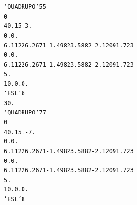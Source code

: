 \begin{center}
\begin{tiny}
\begin{alltt}
                                                'QUADRUPO'     5                                                       5      
                                                 0                                                                            
                                                40.  15.  3.                                                                  
                                                0.  0.                                                                        
                                                6  .1122 6.2671 -1.4982 3.5882 -2.1209 1.723                                  
                                                0.   0.                                                                       
                                                6  .1122 6.2671 -1.4982 3.5882 -2.1209 1.723                                  
                                                5.                                                                            
                                                1 0. 0. 0.                                                                    
                                                'ESL'                                                                  6      
                                                30.                                                                           
                                                'QUADRUPO'      7                                                      7      
                                                 0                                                                            
                                                40.  15.  -7.                                                                 
                                                0.  0.                                                                        
                                                6  .1122 6.2671 -1.4982 3.5882 -2.1209 1.723                                  
                                                0.   0.                                                                       
                                                6  .1122 6.2671 -1.4982 3.5882 -2.1209 1.723                                  
                                                5.                                                                            
                                                1 0. 0. 0.                                                                                                                 
                                                'ESL'                                                                  8      

\end{alltt}
\end{tiny}
\end{center}
